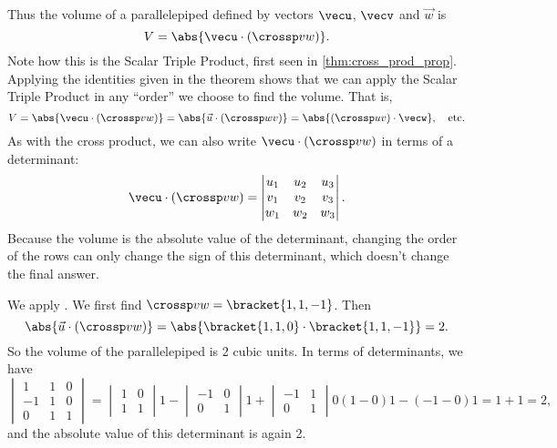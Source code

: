 Thus the volume of a parallelepiped defined by vectors $\vecu$, $\vecv$ and $\vec w$ is
\begin{equation}
V = \abs{\vecu\cdot (\crossp vw)}.\label{eq:crossp2}
\end{equation}
Note how this is the Scalar Triple Product, first seen in \autoref{thm:cross_prod_prop}. Applying the identities given in the theorem shows that we can apply the Scalar Triple Product in any ``order'' we choose to find the volume. That is,
\[V = \abs{\vecu\cdot(\crossp vw)} = \abs{\vec u\cdot (\crossp wv)} = \abs{(\crossp uv)\cdot \vecw},\quad \text{etc.}\]
As with the cross product, we can also write $\vecu\cdot(\crossp vw)$ in terms of a determinant:
\[
 \vecu\cdot(\crossp vw)=
 \begin{vmatrix}u_1&u_2&u_3\\v_1&v_2&v_3\\w_1&w_2&w_3\end{vmatrix}.
\]
Because the volume is the absolute value of the determinant, changing the order of the rows can only change the sign of this determinant, which doesn't change the final answer.


{We apply . We first find $\crossp vw =\bracket{1,1,-1}$. Then
\[\abs{\vec u\cdot(\crossp vw)} = \abs{\bracket{1,1,0}\cdot \bracket{1,1,-1}} = 2.\]
So the volume of the parallelepiped is 2 cubic units.  In terms of determinants, we have
\[
 \begin{vmatrix}1&1&0\\-1&1&0\\0&1&1\end{vmatrix}
 =\begin{vmatrix}1&0\\1&1\end{vmatrix}1
 -\begin{vmatrix}-1&0\\0&1\end{vmatrix}1
 +\begin{vmatrix}-1&1\\0&1\end{vmatrix}0
 (1-0)1-(-1-0)1
 =1+1
 =2,
\]
and the absolute value of this determinant is again 2.}

